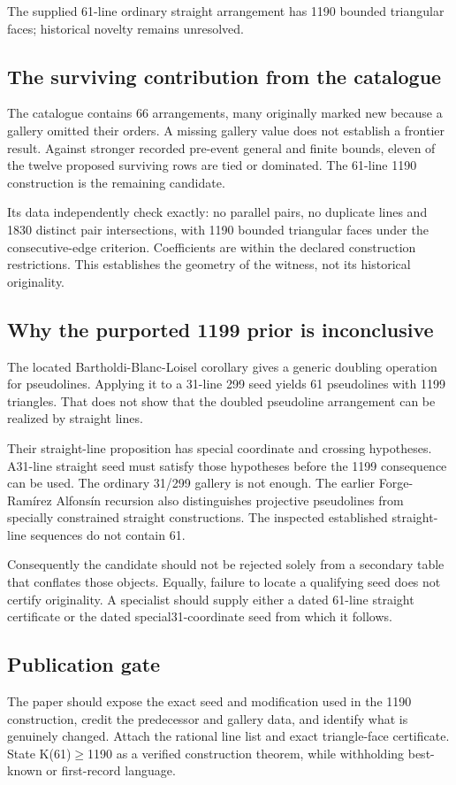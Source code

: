 \documentclass[11pt,a4paper]{article}
\begin{document}
The supplied 61-line ordinary straight arrangement has 1190 bounded triangular faces; historical novelty remains unresolved.

\subsection{The surviving contribution from the catalogue}
The catalogue contains 66 arrangements, many originally marked new because a gallery omitted their orders. A missing gallery value does not establish a frontier result. Against stronger recorded pre-event general and finite bounds, eleven of the twelve proposed surviving rows are tied or dominated. The 61-line 1190 construction is the remaining candidate.

Its data independently check exactly: no parallel pairs, no duplicate lines and 1830 distinct pair intersections, with 1190 bounded triangular faces under the consecutive-edge criterion. Coefficients are within the declared construction restrictions. This establishes the geometry of the witness, not its historical originality.

\subsection{Why the purported 1199 prior is inconclusive}
The located Bartholdi-Blanc-Loisel corollary gives a generic doubling operation for pseudolines. Applying it to a 31-line 299 seed yields 61 pseudolines with 1199 triangles. That does not show that the doubled pseudoline arrangement can be realized by straight lines.

Their straight-line proposition has special coordinate and crossing hypotheses. A31-line straight seed must satisfy those hypotheses before the 1199 consequence can be used. The ordinary 31/299 gallery is not enough. The earlier Forge-Ramírez Alfonsín recursion also distinguishes projective pseudolines from specially constrained straight constructions. The inspected established straight-line sequences do not contain 61.

Consequently the candidate should not be rejected solely from a secondary table that conflates those objects. Equally, failure to locate a qualifying seed does not certify originality. A specialist should supply either a dated 61-line straight certificate or the dated special31-coordinate seed from which it follows.

\subsection{Publication gate}
The paper should expose the exact seed and modification used in the 1190 construction, credit the predecessor and gallery data, and identify what is genuinely changed. Attach the rational line list and exact triangle-face certificate. State K(61)\ensuremath{\geq}1190 as a verified construction theorem, while withholding best-known or first-record language.
\end{document}
